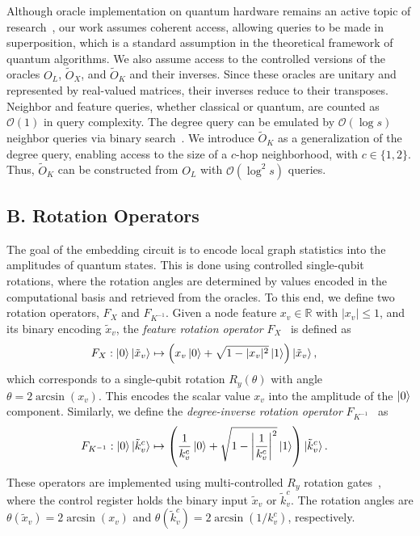 \documentclass[
  reprint,
  superscriptaddress,
  amsmath,amssymb,
  aps,prl,
]{revtex4-2}
\begin{document}
Although oracle implementation on quantum hardware remains an active topic of research~\cite{kuklinski2024s}, our work assumes coherent access, allowing queries to be made in superposition, which is a standard assumption in the theoretical framework of quantum algorithms. We also assume access to the controlled versions of the oracles \(O_L\), \(\tilde O_X\), and  \(\tilde O_K\) and their inverses. Since these oracles are unitary and represented by real-valued matrices, their inverses reduce to their transposes.  
Neighbor and feature queries, whether classical or quantum, are counted as \(\mathcal{O}(1)\) in query complexity. The degree query can be emulated by \(\mathcal O (\log s)\) neighbor queries via binary search~\cite{goldreich2017introduction}. We introduce \(\tilde O_K\) as a generalization of the degree query, enabling access to the size of a \(c\)-hop neighborhood, with \(c \in \{1,2\}\). Thus, \(\tilde O_K\) can be constructed from \(O_L\) with \(\mathcal{O}\left(\log^2 s\right)\) queries.
\subsection{B. Rotation Operators}
\label{sec:rotation-operators}
%
%
%
\noindent The goal of the embedding circuit is to encode local graph statistics into the amplitudes of quantum states. This is done using controlled single-qubit rotations, where the rotation angles are determined by values encoded in the computational basis and retrieved from the oracles. To this end, we define two rotation operators, \(F_X\) and \(F_{K^{-1}}\).
%
Given a node feature \(x_v \in \mathbb{R}\) with \(|x_v| \leq 1\), and its binary encoding \(\tilde{x}_v\), the \textit{feature rotation operator} \(F_X\)~\cite{lin2022lecture} is defined as
\begin{align}
    F_X &: \ket{0} \ket{\tilde{x}_v} \mapsto \left(x_v \ket{0} + \sqrt{1 - |x_v|^2} \ket{1}\right) \ket{\tilde{x}_v},
\end{align}
which corresponds to a single-qubit rotation \(R_y(\theta)\) with angle \(\theta = 2 \arcsin(x_v)\). This encodes the scalar value \(x_v\) into the amplitude of the \(\ket{0}\) component. Similarly, we define the \textit{degree-inverse rotation operator} \(F_{K^{-1}}\)~\cite{tong2021fast} as
\begin{align}
    F_{K^{-1}} &: \ket{0} \ket{\tilde{k}_v^c} \mapsto \left(\frac{1}{k_v^c} \ket{0} + \sqrt{1 - \left|\frac{1}{k_v^c}\right|^2} \ket{1}\right) \ket{\tilde{k}_v^c}.
\end{align}
These operators are implemented using multi-controlled \(R_y\) rotation gates~\cite{lin2022lecture}, where the control register holds the binary input \(\tilde{x}_v\) or \(\tilde{k}_v^c\). The rotation angles are \(\theta(\tilde{x}_v) = 2 \arcsin(x_v)\) and \(\theta(\tilde{k}_v^c) = 2 \arcsin(1 / k_v^c)\), respectively.
%
%
\end{document}
